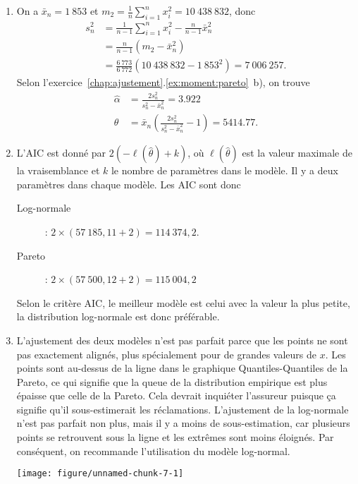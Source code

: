 \begin{exercice}
\begin{sol}
\begin{enumerate}
\item On a $\bar x_n=1~853$ et $m_2=\frac{1}{n}\sum_{i=1}^n x_i^2 = 10~438~832$, donc 
\begin{align*}
s_n^2&=\frac{1}{n-1}\sum_{i=1}^n x_i^2 - \frac{n}{n-1}\bar x_n^2\\
& = \frac{n}{n-1}(m_2-\bar x_n^2)\\
&=\frac{6~773}{6~772}(10~438~832-1~853^2)=7~006~257.
\end{align*}
Selon l'exercice~\ref{chap:ajustement}.\ref{ex:moment:pareto}~b), on trouve
\begin{align*}
\hat\alpha &= \frac{2s_n^2}{s_n^2-\bar x_n^2}=3.922\\
\hat\theta&=\bar x_n \left(\frac{2s_n^2}{s_n^2-\bar x_n^2} -1\right)=5414.77.
\end{align*}


\item L'AIC est donné par $2(-\ell(\hat\theta)+k)$, où $\ell(\hat\theta)$ est la valeur maximale de la vraisemblance et $k$ le nombre de paramètres dans le modèle. Il y a deux paramètres dans chaque modèle. Les AIC sont donc
\begin{description}
\item[Log-normale]: $2\times(57~185,11+2)=114~374,2$.
\item[Pareto]: $2\times(57~500,12+2)=115~004,2$
\end{description}
Selon le critère AIC, le meilleur modèle est celui avec la valeur la plus petite, la distribution log-normale est donc préférable.

\item L'ajustement des deux modèles n'est pas parfait parce que les points ne sont pas exactement alignés, plus spécialement pour de grandes valeurs de $x$. Les points sont au-dessus de la ligne dans le graphique Quantiles-Quantiles de la Pareto, ce qui signifie que la queue de la distribution empirique est plus épaisse que celle de la Pareto. Cela devrait inquiéter l'assureur puisque ça signifie qu'il sous-estimerait les réclamations. L'ajustement de la log-normale n'est pas parfait non plus, mais il y a moins de sous-estimation, car plusieurs points se retrouvent sous la ligne et les extrêmes sont moins éloignés. Par conséquent, on recommande l'utilisation du modèle log-normal.

\begin{knitrout}
\color{fgcolor}
\texttt{[image: figure/unnamed-chunk-7-1]} 
\end{knitrout}


\end{enumerate}
\end{sol}
\end{exercice}
